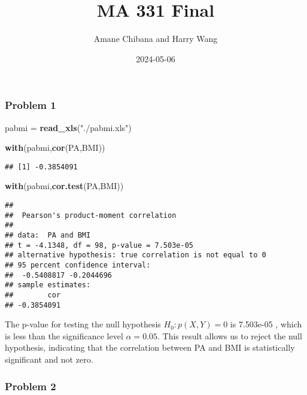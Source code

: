 \documentclass[
]{article}
\title{MA 331 Final}
\author{Amane Chibana and Harry Wang}
\date{2024-05-06}
\newenvironment{Shaded}{\begin{snugshade}}{\end{snugshade}}
\newcommand{\FunctionTok}[1]{\textcolor[rgb]{0.13,0.29,0.53}{\textbf{#1}}}
\newcommand{\NormalTok}[1]{#1}
\newcommand{\OtherTok}[1]{\textcolor[rgb]{0.56,0.35,0.01}{#1}}
\newcommand{\StringTok}[1]{\textcolor[rgb]{0.31,0.60,0.02}{#1}}
\begin{document}
\maketitle

\hypertarget{problem-1}{%
\subsubsection{Problem 1}\label{problem-1}}

\begin{Shaded}
\begin{Highlighting}[]
\NormalTok{pabmi }\OtherTok{=} \FunctionTok{read\_xls}\NormalTok{(}\StringTok{"./pabmi.xls"}\NormalTok{)}

\FunctionTok{with}\NormalTok{(pabmi,}\FunctionTok{cor}\NormalTok{(PA,BMI))}
\end{Highlighting}
\end{Shaded}

\begin{verbatim}
## [1] -0.3854091
\end{verbatim}

\begin{Shaded}
\begin{Highlighting}[]
\FunctionTok{with}\NormalTok{(pabmi,}\FunctionTok{cor.test}\NormalTok{(PA,BMI))}
\end{Highlighting}
\end{Shaded}

\begin{verbatim}
## 
##  Pearson's product-moment correlation
## 
## data:  PA and BMI
## t = -4.1348, df = 98, p-value = 7.503e-05
## alternative hypothesis: true correlation is not equal to 0
## 95 percent confidence interval:
##  -0.5408817 -0.2044696
## sample estimates:
##        cor 
## -0.3854091
\end{verbatim}

The p-value for testing the null hypothesis \(H_0: p(X,Y) = 0\) is
7.503e-05 , which is less than the significance level \(\alpha = 0.05\).
This result allows us to reject the null hypothesis, indicating that the
correlation between PA and BMI is statistically significant and not
zero.

\hypertarget{problem-2}{%
\subsubsection{Problem 2}\label{problem-2}}
\end{document}
